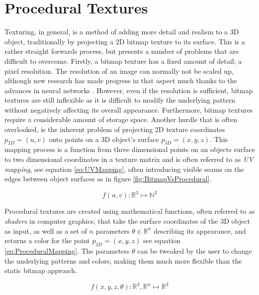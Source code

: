 \section{Procedural Textures}

Texturing, in general, is a method of adding more detail and realism to a 3D object, traditionally by projecting a 2D bitmap texture to its surface. This is a rather straight forwards process, but presents a number of problems that are difficult to overcome. Firstly, a bitmap texture has a fixed amount of detail; a pixel resolution. The resolution of an image can normally not be scaled up, although new research has made progress in that aspect much thanks to the advances in neural networks \cite{richard_2019_learned, li_2019_a}. However, even if the resolution is sufficient, bitmap textures are still inflexible as it is difficult to modify the underlying pattern without negatively affecting its overall appearance. Furthermore, bitmap textures require a considerable amount of storage space. Another hurdle that is often overlooked, is the inherent problem of projecting 2D texture coordinates $p_{2D} = (u,v)$ onto points on a 3D object's surface $p_{3D} = (x,y,z)$. This mapping process is a function from three dimensional points on an objects surface to two dimensional coordinates in a texture matrix and is often referred to as \textit{UV mapping}, see equation \ref{eq:UVMapping}, often introducing visible seams on the edges between object surfaces as in figure \ref{fig:BitmapVsProcedural}. 

\begin{equation}\label{eq:UVMapping}
    f(u,v) : \mathbb{R}^3 \mapsto \mathbb{N}^2
\end{equation}

Procedural textures are created using mathematical functions, often referred to as \textit{shaders} in computer graphics, that take the surface coordinates of the 3D object as input, as well as a set of $n$ parameters $\theta \in \mathbb{R}^n$ describing its appearance, and returns a color for the point $p_{3D} = (x,y,z)$ see equation \ref{eq:ProceduralMapping}. The parameters $\theta$ can be tweaked by the user to change the underlying patterns and colors, making them much more flexible than the static bitmap approach. 

\begin{equation}\label{eq:ProceduralMapping}
    f(x,y,z,\theta): \mathbb{R}^3, \mathbb{R}^n \mapsto \mathbb{R}^3
\end{equation}


